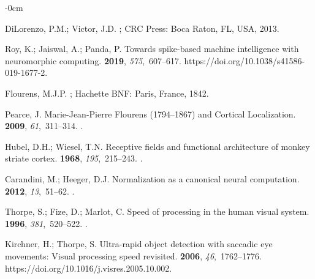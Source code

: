 \documentclass[brainsci, %
               review,accept,pdftex,moreauthors
               ]{Definitions/mdpi}
\begin{document}
\begin{adjustwidth}{-\extralength}{0cm}
\begin{thebibliography}{999}
DiLorenzo, P.M.; Victor, J.D.
; CRC Press:  {Boca Raton, FL, USA,} %
  2013.


Roy, K.; Jaiswal, A.; Panda, P.
\newblock Towards spike-based machine intelligence with neuromorphic computing.
 {\bf 2019}, {\em 575},~607--617.
  {{https://doi.org/10.1038/s41586-019-1677-2}}.

Flourens, M.J.P.
; Hachette {BNF}: {Paris, France,} {1842.} %

Pearce, J.
\newblock Marie-{Jean}-{Pierre} {Flourens} (1794--1867) and {Cortical}
  {Localization}.
 {\bf 2009}, {\em 61},~311--314.\linebreak
{}.

Hubel, D.H.; Wiesel, T.N.
\newblock Receptive fields and functional architecture of monkey striate
  cortex.
 {\bf 1968}, {\em 195},~215--243.
.

Carandini, M.; Heeger, D.J.
\newblock Normalization as a canonical neural computation.
 {\bf 2012}, {\em 13},~51--62.
.

Thorpe, S.; Fize, D.; Marlot, C.
\newblock Speed of processing in the human visual system.
 {\bf 1996}, {\em 381},~520--522.\linebreak
{}.

Kirchner, H.; Thorpe, S.
\newblock Ultra-rapid object detection with saccadic eye movements: {Visual}
  processing speed revisited.
 {\bf 2006}, {\em 46},~1762--1776.
  {{https://doi.org/10.1016/j.visres.2005.10.002}}.


\end{thebibliography}
\end{adjustwidth}
\end{document}
